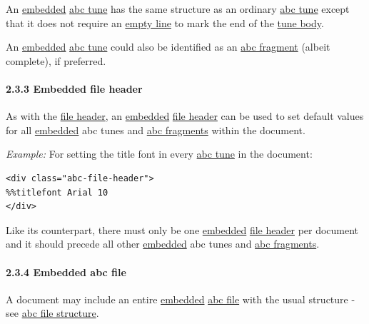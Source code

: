 \documentclass[oneside]{book}
\let\oldparagraph\paragraph
\renewcommand{\paragraph}[1]{\oldparagraph{#1}\mbox{}}
\begin{document}
An \protect\hyperlink{embedded_definition}{embedded}
\protect\hyperlink{abc_tune_definition}{abc tune} has the same structure
as an ordinary \protect\hyperlink{abc_tune_definition}{abc tune} except
that it does not require an
\protect\hyperlink{empty_line_definition}{empty line} to mark the end of
the \protect\hyperlink{tune_body_definition}{tune body}.

An \protect\hyperlink{embedded_definition}{embedded}
\protect\hyperlink{abc_tune_definition}{abc tune} could also be
identified as an \protect\hyperlink{abc_fragment_definition}{abc
fragment} (albeit complete), if preferred.

\hypertarget{embedded_file_header}{\paragraph{2.3.3 Embedded file
header}\label{embedded_file_header}}

As with the \protect\hyperlink{file_header_definition}{file header}, an
\protect\hyperlink{embedded_definition}{embedded}
\protect\hyperlink{file_header_definition}{file header} can be used to
set default values for all
\protect\hyperlink{embedded_definition}{embedded} abc tunes and
\protect\hyperlink{abc_fragment_definition}{abc fragments} within the
document.

\emph{Example:} For setting the title font in every
\protect\hyperlink{abc_tune_definition}{abc tune} in the document:

\begin{verbatim}
<div class="abc-file-header">
%%titlefont Arial 10
</div>
\end{verbatim}

Like its counterpart, there must only be one
\protect\hyperlink{embedded_definition}{embedded}
\protect\hyperlink{file_header_definition}{file header} per document and
it should precede all other
\protect\hyperlink{embedded_definition}{embedded} abc tunes and
\protect\hyperlink{abc_fragment_definition}{abc fragments}.

\hypertarget{embedded_abc_file}{\paragraph{2.3.4 Embedded abc
file}\label{embedded_abc_file}}

A document may include an entire
\protect\hyperlink{embedded_definition}{embedded}
\protect\hyperlink{abc_file_definition}{abc file} with the usual
structure - see \protect\hyperlink{abc_file_structure}{abc file
structure}.
\end{document}
